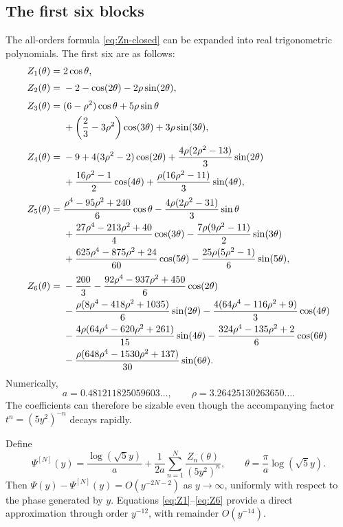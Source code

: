 \documentclass[11pt,oneside]{article}
\theoremstyle{plain}
\theoremstyle{definition}
\theoremstyle{remark}
\begin{document}
\subsection{The first six blocks}

The all-orders formula \eqref{eq:Zn-closed} can be expanded into real
trigonometric polynomials.  The first six are as follows:
\begin{align}
 Z_1(\theta)={}&2\cos\theta,
 \label{eq:Z1}\\[0.25em]
 Z_2(\theta)={}&-2-\cos(2\theta)-2\rho\sin(2\theta),
 \label{eq:Z2}\\[0.25em]
 Z_3(\theta)={}&(6-\rho^2)\cos\theta+5\rho\sin\theta\notag\\
 &+\left(\frac23-3\rho^2\right)\cos(3\theta)
 +3\rho\sin(3\theta),
 \label{eq:Z3}\\[0.25em]
 Z_4(\theta)={}&-9+4(3\rho^2-2)\cos(2\theta)
 +\frac{4\rho(2\rho^2-13)}3\sin(2\theta)\notag\\
 &+\frac{16\rho^2-1}{2}\cos(4\theta)
 +\frac{\rho(16\rho^2-11)}3\sin(4\theta),
 \label{eq:Z4}\\[0.25em]
 Z_5(\theta)={}&
 \frac{\rho^4-95\rho^2+240}{6}\cos\theta
 -\frac{4\rho(2\rho^2-31)}3\sin\theta\notag\\
 &+\frac{27\rho^4-213\rho^2+40}{4}\cos(3\theta)
 -\frac{7\rho(9\rho^2-11)}2\sin(3\theta)\notag\\
 &+\frac{625\rho^4-875\rho^2+24}{60}\cos(5\theta)
 -\frac{25\rho(5\rho^2-1)}6\sin(5\theta),
 \label{eq:Z5}\\[0.25em]
 Z_6(\theta)={}&-\frac{200}{3}
 -\frac{92\rho^4-937\rho^2+450}{6}\cos(2\theta)\notag\\
 &-\frac{\rho(8\rho^4-418\rho^2+1035)}{6}\sin(2\theta)
 -\frac{4(64\rho^4-116\rho^2+9)}3\cos(4\theta)\notag\\
 &-\frac{4\rho(64\rho^4-620\rho^2+261)}{15}\sin(4\theta)
 -\frac{324\rho^4-135\rho^2+2}{6}\cos(6\theta)\notag\\
 &-\frac{\rho(648\rho^4-1530\rho^2+137)}{30}\sin(6\theta).
 \label{eq:Z6}
\end{align}
Numerically,
\begin{equation}
 a=0.481211825059603\ldots,
 \qquad
 \rho=3.26425130263650\ldots.
 \label{eq:numerical-a-rho}
\end{equation}
The coefficients can therefore be sizable even though the accompanying factor
\(t^n=(5y^2)^{-n}\) decays rapidly.

\begin{summarybox}[title={Six-block approximation}]
Define
\[
 \Psi^{[N]}(y)=\frac{\log(\sqrt5y)}a
 +\frac1{2a}\sum_{n=1}^{N}\frac{Z_n(\theta)}{(5y^2)^n},
 \qquad
 \theta=\frac{\pi}{a}\log(\sqrt5y).
\]
Then \(\Psi(y)-\Psi^{[N]}(y)=O(y^{-2N-2})\) as \(y\to\infty\), uniformly
with respect to the phase generated by \(y\).  Equations
\eqref{eq:Z1}--\eqref{eq:Z6} provide a direct approximation through order
\(y^{-12}\), with remainder \(O(y^{-14})\).
\end{summarybox}
\end{document}

